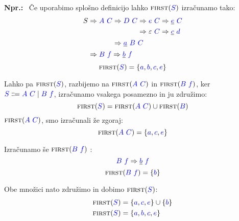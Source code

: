\documentclass{article}
\newcommand{\Ex}{\textbf{Npr.:}\ }
\newcommand{\FIRST}{\textsc{first}}
\newcommand{\Symbol}[1]{\textcolor{blue}{#1}}
\newcommand{\Null}{\varepsilon}
\newcommand{\Arrow}{\Coloneq}
\newcommand{\Derive}{\Rightarrow}
\newcommand{\Seq}{\ }
\newcommand{\Union}{\mathrel{|}}
\begin{document}
\Ex
Če uporabimo splošno definicijo lahko $\FIRST(\Symbol{S})$ izračunamo tako:
\begin{equation*}
  S \begin{aligned}[t]
    &\Derive \Symbol{A} \Seq \Symbol{C} \begin{aligned}[t]
      &\Derive \Symbol{D} \Seq \Symbol{C} \begin{aligned}[t]
        &\Derive \Symbol{e} \Seq \Symbol{C} \Derive \underline{\Symbol{e}} \Seq \Symbol{C} \\
        &\Derive \Null \Seq \Symbol{C} \Derive \underline{\Symbol{c}} \Seq \Symbol{d} \\
      \end{aligned}\\
      &\Derive \underline{\Symbol{a}} \Seq \Symbol{B} \Seq \Symbol{C}
    \end{aligned}\\
    &\Derive \Symbol{B} \Seq \Symbol{f} \Derive \underline{\Symbol{b}} \Seq \Symbol{f}
  \end{aligned}
\end{equation*}
\begin{equation*}
  \FIRST(\Symbol{S}) = \{\Symbol{a}, \Symbol{b}, \Symbol{c}, \Symbol{e}\}
\end{equation*}

Lahko pa $\FIRST(\Symbol{S})$, razbijemo na $\FIRST(\Symbol{A} \Seq \Symbol{C})$ in $\FIRST(\Symbol{B} \Seq \Symbol{f})$, ker $\Symbol{S} \Arrow \Symbol{A} \Seq \Symbol{C} \Union \Symbol{B} \Seq \Symbol{f}$, izračunamo vsakega posamezno in ju združimo:
\begin{equation*}
  \FIRST(\Symbol{S}) = \FIRST(\Symbol{A} \Seq \Symbol{C}) \cup \FIRST(\Symbol{B})
\end{equation*}
$\FIRST(\Symbol{A} \Seq \Symbol{C})$, smo izračunali že zgoraj:
\begin{equation*}
  \FIRST(\Symbol{A} \Seq \Symbol{C}) = \{\Symbol{a}, \Symbol{c}, \Symbol{e}\}
\end{equation*}

Izračunamo še $\FIRST(\Symbol{B} \Seq \Symbol{f})$ :
\begin{equation*}
  \Symbol{B} \Seq \Symbol{f} \Derive \underline{\Symbol{b}} \Seq \Symbol{f}
\end{equation*}
\begin{equation*}
  \FIRST(\Symbol{B} \Seq \Symbol{f}) = \{\Symbol{b}\}
\end{equation*}

Obe množici nato združimo in dobimo $\FIRST(\Symbol{S})$:
\begin{align*}
  \FIRST(\Symbol{S}) &= \{\Symbol{a}, \Symbol{c}, \Symbol{e}\} \cup \{\Symbol{b}\}\\
  \FIRST(\Symbol{S}) &= \{\Symbol{a}, \Symbol{b}, \Symbol{c}, \Symbol{e}\}
\end{align*}
\end{document}

